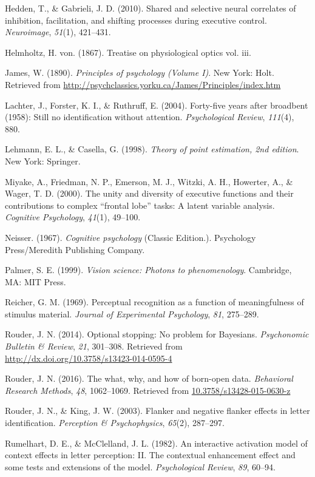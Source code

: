 \documentclass[english,floatsintext,man]{apa6}
\theoremstyle{definition}
\theoremstyle{definition}
\theoremstyle{definition}
\theoremstyle{remark}
\begin{document}
\hypertarget{ref-Hedden:Gabrieli:2010}{}
Hedden, T., \& Gabrieli, J. D. (2010). Shared and selective neural
correlates of inhibition, facilitation, and shifting processes during
executive control. \emph{Neuroimage}, \emph{51}(1), 421--431.

\hypertarget{ref-Helmholtz:1867}{}
Helmholtz, H. von. (1867). Treatise on physiological optics vol. iii.

\hypertarget{ref-James:1890a}{}
James, W. (1890). \emph{Principles of psychology (Volume I)}. New York:
Holt. Retrieved from
\url{http://psychclassics.yorku.ca/James/Principles/index.htm}

\hypertarget{ref-Lachter:etal:2004}{}
Lachter, J., Forster, K. I., \& Ruthruff, E. (2004). Forty-five years
after broadbent (1958): Still no identification without attention.
\emph{Psychological Review}, \emph{111}(4), 880.

\hypertarget{ref-Lehmann:Casella:1998}{}
Lehmann, E. L., \& Casella, G. (1998). \emph{Theory of point estimation,
2nd edition}. New York: Springer.

\hypertarget{ref-Miyake:etal:2000}{}
Miyake, A., Friedman, N. P., Emerson, M. J., Witzki, A. H., Howerter,
A., \& Wager, T. D. (2000). The unity and diversity of executive
functions and their contributions to complex ``frontal lobe'' tasks: A
latent variable analysis. \emph{Cognitive Psychology}, \emph{41}(1),
49--100.

\hypertarget{ref-Neisser:1967}{}
Neisser. (1967). \emph{Cognitive psychology} (Classic Edition.).
Psychology Press/Meredith Publishing Company.

\hypertarget{ref-Palmer:1999}{}
Palmer, S. E. (1999). \emph{Vision science: Photons to phenomenology}.
Cambridge, MA: MIT Press.

\hypertarget{ref-Reicher:1969}{}
Reicher, G. M. (1969). Perceptual recognition as a function of
meaningfulness of stimulus material. \emph{Journal of Experimental
Psychology}, \emph{81}, 275--289.

\hypertarget{ref-Rouder:2014}{}
Rouder, J. N. (2014). Optional stopping: No problem for Bayesians.
\emph{Psychonomic Bulletin \& Review}, \emph{21}, 301--308. Retrieved
from \url{http://dx.doi.org/10.3758/s13423-014-0595-4}

\hypertarget{ref-Rouder:2016}{}
Rouder, J. N. (2016). The what, why, and how of born-open data.
\emph{Behavioral Research Methods}, \emph{48}, 1062--1069. Retrieved
from \url{10.3758/s13428-015-0630-z}

\hypertarget{ref-Rouder:King:2003}{}
Rouder, J. N., \& King, J. W. (2003). Flanker and negative flanker
effects in letter identification. \emph{Perception \& Psychophysics},
\emph{65}(2), 287--297.

\hypertarget{ref-Rumelhart:McClelland:1982}{}
Rumelhart, D. E., \& McClelland, J. L. (1982). An interactive activation
model of context effects in letter perception: II. The contextual
enhancement effect and some tests and extensions of the model.
\emph{Psychological Review}, \emph{89}, 60--94.
\end{document}
